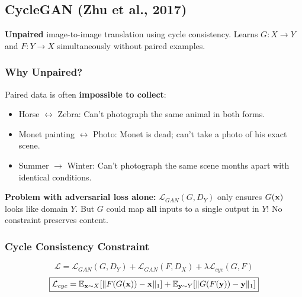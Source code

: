 \subsection{CycleGAN (Zhu et al., 2017)}

\begin{definition}[CycleGAN]
\textbf{Unpaired} image-to-image translation using cycle consistency. Learns $G: X \to Y$ and $F: Y \to X$ simultaneously without paired examples.
\end{definition}

\subsubsection{Why Unpaired?}
Paired data is often \textbf{impossible to collect}:
\begin{itemize}
\item Horse $\leftrightarrow$ Zebra: Can't photograph the same animal in both forms.
\item Monet painting $\leftrightarrow$ Photo: Monet is dead; can't take a photo of his exact scene.
\item Summer $\to$ Winter: Can't photograph the same scene months apart with identical conditions.
\end{itemize}

\textbf{Problem with adversarial loss alone:} $\mathcal{L}_{GAN}(G, D_Y)$ only ensures $G(\mathbf{x})$ looks like domain $Y$. But $G$ could map \textbf{all} inputs to a single output in $Y$! No constraint preserves content.

\subsubsection{Cycle Consistency Constraint}
\begin{equation}\label{eq:cyclegan}
\boxed{\mathcal{L} = \mathcal{L}_{GAN}(G, D_Y) + \mathcal{L}_{GAN}(F, D_X) + \lambda \mathcal{L}_{cyc}(G, F)}
\end{equation}
\begin{equation}\label{eq:cycle_loss}
\boxed{\mathcal{L}_{cyc} = \mathbb{E}_{\mathbf{x} \sim X}[\|F(G(\mathbf{x})) - \mathbf{x}\|_1] + \mathbb{E}_{\mathbf{y} \sim Y}[\|G(F(\mathbf{y})) - \mathbf{y}\|_1]}
\end{equation}


